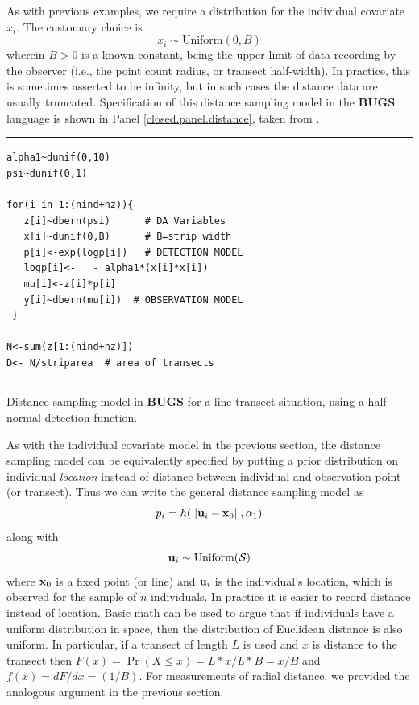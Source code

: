 As with previous examples, we require a distribution for the
individual covariate $x_{i}$. The customary choice is
\[
x_{i} \sim \mbox{Uniform}(0,B)
\]
wherein $B>0$ is a known constant, being the upper limit of data
recording by the observer (i.e., the point count radius, or transect
half-width). In practice, this is sometimes asserted to be infinity,
but in such cases the distance data are usually truncated.
Specification of this distance sampling model in the {\bf BUGS}
language  is
shown in Panel \ref{closed.panel.distance}, taken from \citet{royle_dorazio:2008}.


\begin{panel}
\centering
\rule[0.15in]{\textwidth}{.03in}
\begin{minipage}{5in}
\begin{verbatim}
alpha1~dunif(0,10)
psi~dunif(0,1)

for(i in 1:(nind+nz)){
   z[i]~dbern(psi)      # DA Variables
   x[i]~dunif(0,B)      # B=strip width
   p[i]<-exp(logp[i])   # DETECTION MODEL
   logp[i]<-   - alpha1*(x[i]*x[i])
   mu[i]<-z[i]*p[i]
   y[i]~dbern(mu[i])  # OBSERVATION MODEL
 }

N<-sum(z[1:(nind+nz)])
D<- N/striparea  # area of transects
\end{verbatim}
\end{minipage}
\rule[-0.15in]{\textwidth}{.03in}
\caption{Distance sampling model in {\bf BUGS} for a line transect situation, using a half-normal
detection function.}
\label{closed.panel.distance}
\end{panel}

As with the individual covariate model in the previous section, the
distance sampling model can be equivalently specified by putting a
prior distribution on individual {\it location} instead of distance
between individual and observation point (or transect).  Thus we can
write the general distance sampling model as
\[
p_{i} = h(||{\bf u}_{i} - {\bf x}_0||,\alpha_{1})
\]
along with
\[
 {\bf u}_{i} \sim \mbox{Uniform}({\cal S})
\]
where ${\bf x}_{0}$ is a fixed point (or line) and ${\bf u}_{i}$ is
the individual's location,  which is observed for the sample of $n$ individuals. In
practice it is easier to record distance instead of location.  Basic
math can be used to argue that if individuals have a uniform
distribution in space, then the distribution of Euclidean distance is
also uniform. In particular, if a transect of length $L$ is used and $x$
is distance to the transect then $F(x) = \Pr(X\le x) = L*x/L*B = x/B$ and
$f(x) = dF/dx = (1/B)$. For measurements of radial distance, we
provided the analogous argument in the
previous section.  

